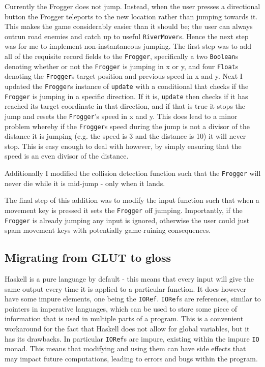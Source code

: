\documentclass[12pt, a4paper]{report}
\begin{document}
Currently the Frogger does not jump.
Instead, when the user presses a directional button the Frogger teleports to the new location rather than jumping towards it.
This makes the game considerably easier than it should be; the user can always outrun road enemies and catch up to useful \verb|RiverMover|s.
Hence the next step was for me to implement non-instantaneous jumping.
The first step was to add all of the requisite record fields to the \verb|Frogger|, specifically a two \verb|Boolean|s denoting whether or not the \verb|Frogger| is jumping in x or y, and four \verb|Float|s denoting the \verb|Frogger|s target position and previous speed in x and y.
Next I updated the \verb|Frogger|s instance of \verb|update| with a conditional that checks if the \verb|Frogger| is jumping in a specific direction.
If it is, \verb|update| then checks if it has reached its target coordinate in that direction, and if that is true it stops the jump and resets the \verb|Frogger|'s speed in x and y.
This does lead to a minor problem whereby if the \verb|Frogger|s speed during the jump is not a divisor of the distance it is jumping (e.g. the speed is 3 and the distance is 10) it will never stop.
This is easy enough to deal with however, by simply ensuring that the speed is an even divisor of the distance.

\par

Additionally I modified the collision detection function such that the \verb|Frogger| will never die while it is mid-jump - only when it lands.

\par

The final step of this addition was to modify the input function such that when a movement key is pressed it sets the \verb|Frogger| off jumping.
Importantly, if the \verb|Frogger| is already jumping any input is ignored, otherwise the user could just spam movement keys with potentially game-ruining consequences.

\subsection{Migrating from GLUT to gloss}

Haskell is a pure language by default - this means that every input will give the same output every time it is applied to a particular function.
It does however have some impure elements, one being the \verb|IORef|.
\verb|IORef|s are references, similar to pointers in imperative languages, which can be used to store some piece of information that is used in multiple parts of a program\cite{iorefs}.
This is a convenient workaround for the fact that Haskell does not allow for global variables, but it has its drawbacks.
In particular \verb|IORef|s are impure, existing within the impure \verb|IO| monad.
This means that modifying and using them can have side effects that may impact future computations, leading to errors and bugs within the program.
\end{document}
